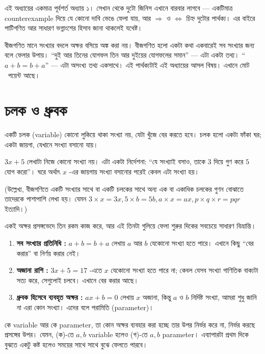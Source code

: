 \documentclass[11pt]{article}
\begin{document}

\noindent
এই অধ্যায়ের একমাত্র পূর্বশর্ত অধ্যায় ১। সেখান থেকে দুটো জিনিস এখানে
বারবার লাগবে --- একটিমাত্র counterexample দিয়ে যে কোনো দাবি ভেঙে ফেলা যায়, আর
$\Rightarrow$ ও $\Leftrightarrow$ চিহ্ন দুটোর পার্থক্য। এর বাইরে পাটিগণিত আর
সাধারণ ভগ্নাংশের হিসাব জানা থাকলেই যথেষ্ট।

\noindent বীজগণিত মানে সংখ্যার বদলে অক্ষর বসিয়ে অঙ্ক করা নয়। বীজগণিত হলো একটা কথা একবারেই
সব সংখ্যার জন্য বলে ফেলার উপায়। ``দুই আর তিনের যোগফল তিন আর দুইয়ের যোগফলের
সমান'' --- এটা একটা তথ্য। ``$a + b = b + a$'' --- এটা অসংখ্য তথ্য একসাথে।
এই পার্থক্যটাই এই অধ্যায়ের আসল বিষয়। এখানে মোট \totalpoints\ পয়েন্ট আছে।

\section{চলক ও ধ্রুবক}

\begin{idea}
একটি চলক (variable) কোনো লুকিয়ে থাকা সংখ্যা নয়, যেটা খুঁজে বের করতে হবে। চলক
হলো একটা ফাঁকা ঘর; একটা জায়গা, যেখানে সংখ্যা বসানো যায়।

$3x + 5$ লেখাটা নিজে কোনো সংখ্যা নয়। এটা একটা নির্দেশনা: ``যে সংখ্যাই বসাও, তাকে
$3$ দিয়ে গুণ করে $5$ যোগ করো''। ঘরে অর্থাৎ $x$ -এর জায়গায় সংখ্যা বসানোর পরেই কেবল এটা সংখ্যা হয়।

(উল্লেখ্য, বীজগণিতে একটি সংখ্যার সাথে বা একটি চলকের সাথে অন্য এক বা একাধিক চলকের গুণন বোঝাতে তাদেরকে পাশাপাশি লেখা হয়। যেমন $3 \times x=3x, 5 \times b=5b, a \times x=ax, p \times q \times r=pqr$ ইত্যাদি।)
\end{idea}

\noindent
একই অক্ষর প্রসঙ্গভেদে তিন রকম কাজ করে, আর এই তিনটা গুলিয়ে ফেলা শুরুর দিকের
সবচেয়ে সাধারণ বিভ্রান্তি।

\begin{enumerate}
  \item \textbf{সব সংখ্যার প্রতিনিধি :} $a + b = b + a$ লেখায় $a$ আর $b$ যেকোনো
        সংখ্যা হতে পারে। এখানে কিছু ``বের করার'' বা নির্ণয় করার নেই।
  \item \textbf{অজানা রাশি :} $3x + 5 = 17$ -এতে $x$ যেকোনো সংখ্যা হতে পারে না;
        কেবল যেসব সংখ্যা গাণিতিক বাক্যটা সত্য করে, সেগুলোই চলবে। এখানে বের করার আছে।
  \item \textbf{ধ্রুবক হিসেবে ব্যবহৃত অক্ষর :} $ax + b = 0$ লেখায় $x$ অজানা,
        কিন্তু $a$ ও $b$ নির্দিষ্ট সংখ্যা, আমরা শুধু জানি না এরা কোন সংখ্যা।
        এদের বলে পরামিতি (parameter)। 
        
\end{enumerate}
 কে variable আর কে parameter, তা কোন অক্ষর ব্যবহার করা হচ্ছে তার উপর নির্ভর করে না, নির্ভর করছে প্রসঙ্গের উপর। যেমন, (ক)-তে $a, b$ variable হলেও (গ)-তে $a, b$ parameter। এব্যাপারটা প্রথম দিকে বুঝতে একটু কষ্ট হলেও সময়ের সাথে সাথে বুঝে ফেলতে পারবে।
        
\end{document}
